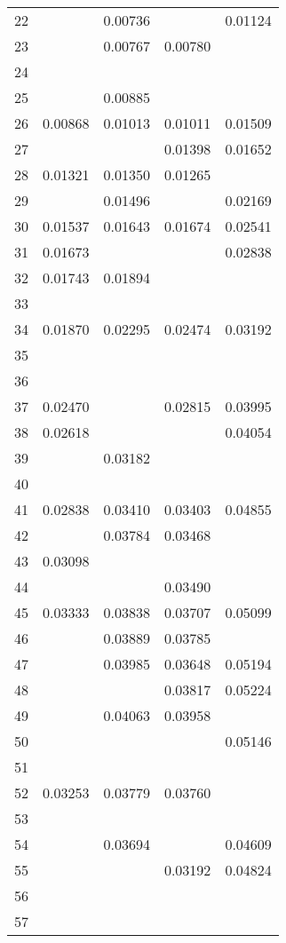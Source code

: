 \documentclass{elsarticle}
\begin{document}
\begin{center}
\begin{longtable}{|c|cccc|}
  22 &  & 0.00736 &  & 0.01124 \\
  23 &  & 0.00767 & 0.00780 &  \\
  24 &  &  &  &  \\
  25 &  & 0.00885 &  &  \\
  26 & 0.00868 & 0.01013 & 0.01011 & 0.01509 \\
  27 &  &  & 0.01398 & 0.01652 \\
  28 & 0.01321 & 0.01350 & 0.01265 &  \\
  29 &  & 0.01496 &  & 0.02169 \\
  30 & 0.01537 & 0.01643 & 0.01674 & 0.02541 \\
  31 & 0.01673 &  &  & 0.02838 \\
  32 & 0.01743 & 0.01894 &  &  \\
  33 &  &  &  &  \\
  34 & 0.01870 & 0.02295 & 0.02474 & 0.03192 \\
  35 &  &  &  &  \\
  36 &  &  &  &  \\
  37 & 0.02470 &  & 0.02815 & 0.03995 \\
  38 & 0.02618 &  &  & 0.04054 \\
  39 &  & 0.03182 &  &  \\
  40 &  &  &  &  \\
  41 & 0.02838 & 0.03410 & 0.03403 & 0.04855 \\
  42 &  & 0.03784 & 0.03468 &  \\
  43 & 0.03098 &  &  &  \\
  44 &  &  & 0.03490 &  \\
  45 & 0.03333 & 0.03838 & 0.03707 & 0.05099 \\
  46 &  & 0.03889 & 0.03785 &  \\
  47 &  & 0.03985 & 0.03648 & 0.05194 \\
  48 &  &  & 0.03817 & 0.05224 \\
  49 &  & 0.04063 & 0.03958 &  \\
  50 &  &  &  & 0.05146 \\
  51 &  &  &  &  \\
  52 & 0.03253 & 0.03779 & 0.03760 &  \\
  53 &  &  &  &  \\
  54 &  & 0.03694 &  & 0.04609 \\
  55 &  &  & 0.03192 & 0.04824 \\
  56 &  &  &  &  \\
  57 &  &  &  &  \\

\end{longtable}
\end{center}
\end{document}
